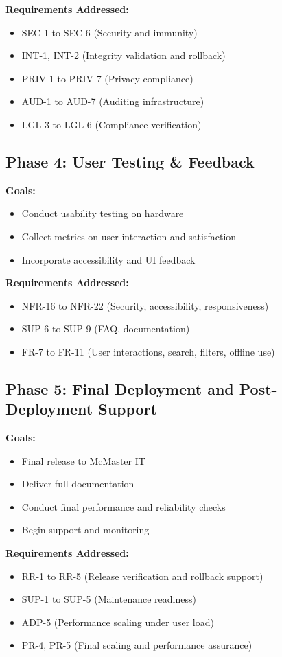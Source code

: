 \documentclass[12pt]{article}
\begin{document}
\textbf{Requirements Addressed:}
\begin{itemize}
  \item SEC-1 to SEC-6 (Security and immunity)
  \item INT-1, INT-2 (Integrity validation and rollback)
  \item PRIV-1 to PRIV-7 (Privacy compliance)
  \item AUD-1 to AUD-7 (Auditing infrastructure)
  \item LGL-3 to LGL-6 (Compliance verification)
\end{itemize}

\subsection*{Phase 4: User Testing \& Feedback}
\textbf{Goals:}
\begin{itemize}
  \item Conduct usability testing on hardware
  \item Collect metrics on user interaction and satisfaction
  \item Incorporate accessibility and UI feedback
\end{itemize}

\textbf{Requirements Addressed:}
\begin{itemize}
  \item NFR-16 to NFR-22 (Security, accessibility, responsiveness)
  \item SUP-6 to SUP-9 (FAQ, documentation)
  \item FR-7 to FR-11 (User interactions, search, filters, offline use)
\end{itemize}

\subsection*{Phase 5: Final Deployment and Post-Deployment Support}
\textbf{Goals:}
\begin{itemize}
  \item Final release to McMaster IT
  \item Deliver full documentation
  \item Conduct final performance and reliability checks
  \item Begin support and monitoring
\end{itemize}

\textbf{Requirements Addressed:}
\begin{itemize}
  \item RR-1 to RR-5 (Release verification and rollback support)
  \item SUP-1 to SUP-5 (Maintenance readiness)
  \item ADP-5 (Performance scaling under user load)
  \item PR-4, PR-5 (Final scaling and performance assurance)
\end{itemize}
\end{document}
